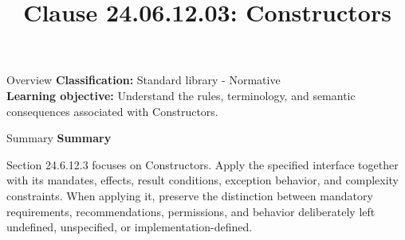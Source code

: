 \documentclass[10pt,letterpaper]{article}
\title{Clause 24.06.12.03: Constructors}
\author{}
\date{}
\begin{document}
\maketitle
\begin{CornellOverviewBox}{Overview}
\textbf{Classification:} Standard library - Normative\\[2pt]
\textbf{Learning objective:} Understand the rules, terminology, and semantic consequences associated with Constructors.
\end{CornellOverviewBox}\begin{CornellSummaryBox}{Summary}
{\sffamily\bfseries\color{Accent} Summary}\par\vspace{3pt}Section 24.6.12.3 focuses on Constructors. Apply the specified interface together with its mandates, effects, result conditions, exception behavior, and complexity constraints. When applying it, preserve the distinction between mandatory requirements, recommendations, permissions, and behavior deliberately left undefined, unspecified, or implementation-defined.
\end{CornellSummaryBox}
\end{document}
